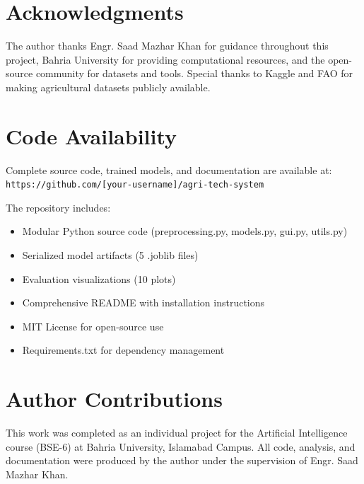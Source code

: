 \documentclass[conference]{IEEEtran}
\begin{document}
\vspace{12pt}

\section*{Acknowledgments}
The author thanks Engr. Saad Mazhar Khan for guidance throughout this project, Bahria University for providing computational resources, and the open-source community for datasets and tools. Special thanks to Kaggle and FAO for making agricultural datasets publicly available.

\section*{Code Availability}
Complete source code, trained models, and documentation are available at: \\
\texttt{https://github.com/[your-username]/agri-tech-system}

The repository includes:
\begin{itemize}
    \item Modular Python source code (preprocessing.py, models.py, gui.py, utils.py)
    \item Serialized model artifacts (5 .joblib files)
    \item Evaluation visualizations (10 plots)
    \item Comprehensive README with installation instructions
    \item MIT License for open-source use
    \item Requirements.txt for dependency management
\end{itemize}

\section*{Author Contributions}
This work was completed as an individual project for the Artificial Intelligence course (BSE-6) at Bahria University, Islamabad Campus. All code, analysis, and documentation were produced by the author under the supervision of Engr. Saad Mazhar Khan.
\end{document}

